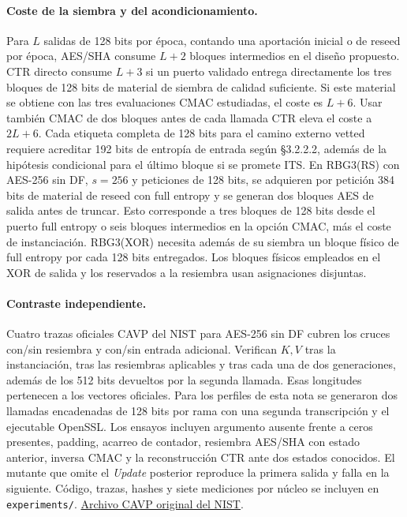 \paragraph{Coste de la siembra y del acondicionamiento.} Para $L$ salidas de 128 bits por época,
contando una aportación inicial o de reseed por época, AES/SHA consume $L+2$ bloques intermedios
en el diseño propuesto. CTR directo consume $L+3$ si un puerto validado entrega directamente
los tres bloques de 128 bits de material de siembra de calidad suficiente. Si este material se
obtiene con las tres evaluaciones CMAC estudiadas, el coste es $L+6$. Usar también CMAC de dos
bloques antes de cada llamada CTR eleva el coste a $2L+6$. Cada etiqueta completa de 128 bits
para el camino externo vetted requiere acreditar 192 bits de entropía de entrada según
§3.2.2.2, además de la hipótesis condicional para el último bloque si se promete ITS.
En RBG3(RS) con AES-256 sin DF, $s=256$ y peticiones de 128 bits, se adquieren por petición
384 bits de material de reseed con full entropy y se generan dos bloques AES de salida antes de
truncar. Esto corresponde a tres bloques de 128 bits desde el puerto full entropy o seis bloques
intermedios en la opción CMAC, más el coste de instanciación. RBG3(XOR) necesita además de su
siembra un bloque físico de full entropy por cada 128 bits entregados. Los bloques físicos empleados
en el XOR de salida y los reservados a la resiembra usan asignaciones disjuntas\cite[§§3.2.2.2, 6.4, 6.5]{nist90c}.

\paragraph{Contraste independiente.} Cuatro trazas oficiales CAVP del NIST para AES-256 sin DF
cubren los cruces con/sin resiembra y con/sin entrada adicional. Verifican $K,V$ tras la
instanciación, tras las resiembras aplicables y tras cada una de dos generaciones, además de los
512 bits devueltos por la segunda llamada. Esas longitudes pertenecen a los vectores oficiales.
Para los perfiles de esta nota se generaron dos llamadas encadenadas de 128 bits por rama con una
segunda transcripción y el ejecutable OpenSSL. Los ensayos incluyen argumento ausente frente a
ceros presentes, padding, acarreo de contador, resiembra AES/SHA con estado anterior, inversa
CMAC y la reconstrucción CTR ante dos estados conocidos. El mutante que omite el \emph{Update}
posterior reproduce la primera salida y falla en la siguiente. Código, trazas, hashes y siete
mediciones por núcleo se incluyen en \texttt{experiments/}.
\href{https://csrc.nist.gov/CSRC/media/Projects/Cryptographic-Algorithm-Validation-Program/documents/drbg/drbgtestvectors.zip}{Archivo CAVP original del NIST}.

